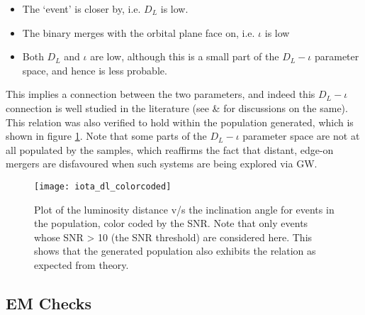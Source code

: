         \begin{itemize}

            \item The `event' is closer by, i.e. $D_L$ is low.

            \item The binary merges with the orbital plane face on, i.e. $\iota$ is low

            \item Both $D_L$ and $\iota$ are low, although this is a small part of the
                $D_L-\iota$ parameter space, and hence is less probable.

        \end{itemize}

        This implies a connection between the two parameters, and indeed this $D_L-\iota
        $ connection is well studied in the literature (see \cite{schutz_2011} \&
        \cite{seto_2015} for discussions on the same). This relation was also verified
        to hold within the population generated, which is shown in figure
        \ref{fig:dl_iota_correlation}. Note that some parts of the $D_L - \iota$
        parameter space are not at all populated by the samples, which reaffirms the
        fact that distant, edge-on mergers are disfavoured when such systems are being
        explored via GW.

        \begin{figure}[htpb]
            \centering
            \texttt{[image: iota\_dl\_colorcoded]}
            \caption[$D_L-\iota$ correlation in the population]{
                Plot of the luminosity distance v/s the inclination angle for events in
                the population, color coded by the SNR. Note that only events whose SNR
                > 10 (the SNR threshold) are considered here.  This shows that the
                generated population also exhibits the relation as expected from theory.
            }
            \label{fig:dl_iota_correlation}
        \end{figure}

    \subsection{EM Checks}\label{sub:em_checks}

